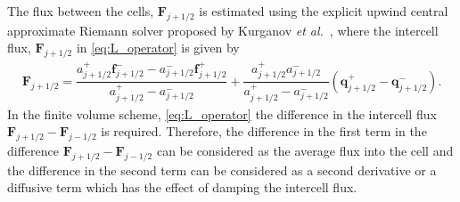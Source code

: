 \documentclass[preprint,sort&compress,1p]{article}
\begin{document}
The flux between the cells, $\mathbf{F}_{j + 1/2}$ is estimated using the explicit upwind central approximate Riemann solver proposed by Kurganov \emph{et al.}~\cite{Kurganov-etal-2001-707}, where the intercell flux, $\mathbf{F}_{j+1/2}$ in \eqref{eq:L_operator} is given by
\begin{gather}
\label{eq:Kurganov}
\mathbf{F}_{j+1/2} = \dfrac{a^+_{j+1/2} \mathbf{f}^-_{j+1/2} - a^-_{j+1/2} \mathbf{f}^+_{j+1/2}}{a^+_{j+1/2} - a^-_{j+1/2}} + \dfrac{a^+_{j+1/2} a^-_{j+1/2}}{a^+_{j+1/2} - a^-_{j+1/2}} \left ( \mathbf{q}^+_{j+1/2} - \mathbf{q}^-_{j+1/2} \right ).
\end{gather}
In the finite volume scheme, \eqref{eq:L_operator} the difference in the intercell flux $\mathbf{F}_{j+1/2} - \mathbf{F}_{j-1/2}$ is required. Therefore, the difference in the first term in the difference $\mathbf{F}_{j+1/2} - \mathbf{F}_{j-1/2}$ can be considered as the average flux into the cell and the difference in the second term can be considered as a second derivative or a diffusive term which has the effect of damping the intercell flux.
\end{document}

